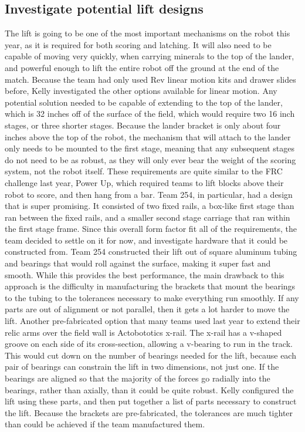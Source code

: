 \documentclass{article}
\begin{document}
\subsection{Investigate potential lift designs}
The lift is going to be one of the most important mechanisms on the robot this year, as it is required for both scoring and latching. It will also need to be capable of moving very quickly, when carrying minerals to the top of the lander, and powerful enough to lift the entire robot off the ground at the end of the match. Because the team had only used Rev linear motion kits and drawer slides before, Kelly investigated the other options available for linear motion. Any potential solution needed to be capable of extending to the top of the lander, which is 32 inches off of the surface of the field, which would require two 16 inch stages, or three shorter stages. Because the lander bracket is only about four inches above the top of the robot, the mechanism that will attach to the lander only needs to be mounted to the first stage, meaning that any subsequent stages do not need to be as robust, as they will only ever bear the weight of the scoring system, not the robot itself. These requirements are quite similar to the FRC challenge last year, Power Up, which required teams to lift blocks above their robot to score, and then hang from a bar. Team 254, in particular, had a design that is super promising. It consisted of two fixed rails, a box-like first stage than ran between the fixed rails, and a smaller second stage carriage that ran within the first stage frame. Since this overall form factor fit all of the requirements, the team decided to settle on it for now, and investigate hardware that it could be constructed from. Team 254 constructed their lift out of square aluminum tubing and bearings that would roll against the surface, making it super fast and smooth. While this provides the best performance, the main drawback to this approach is the difficulty in manufacturing the brackets that mount the bearings to the tubing to the tolerances necessary to make everything run smoothly. If any parts are out of alignment or not parallel, then it gets a lot harder to move the lift. Another pre-fabricated option that many teams used last year to extend their relic arms over the field wall is Actobototics x-rail. The x-rail has a v-shaped groove on each side of its cross-section, allowing a v-bearing to run in the track. This would cut down on the number of bearings needed for the lift, because each pair of bearings can constrain the lift in two dimensions, not just one. If the bearings are aligned so that the majority of the forces go radially into the bearings, rather than axially, than it could be quite robust. Kelly configured the lift using these parts, and then put together a list of parts necessary to construct the lift. Because the brackets are pre-fabricated, the tolerances are much tighter than could be achieved if the team manufactured them. 
\end{document}
